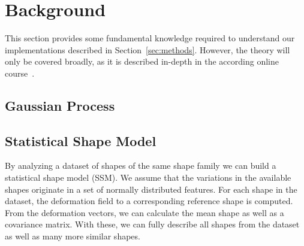 \section{Background}
\label{sec:background}

This section provides some fundamental knowledge required to understand our implementations described in Section~\ref{sec:methods}.
However, the theory will only be covered broadly, as it is described in-depth in the according online course~\citep{mooc2019statistical}.


\subsection{Gaussian Process}
\label{subsec:gp}



\subsection{Statistical Shape Model}
\label{subsec:ssm}

By analyzing a dataset of shapes of the same shape family we can build a statistical shape model (SSM).
We assume that the variations in the available shapes originate in a set of normally distributed features.
For each shape in the dataset, the deformation field to a corresponding reference shape is computed.
From the deformation vectors, we can calculate the mean shape as well as a covariance matrix.
With these, we can fully describe all shapes from the dataset as well as many more similar shapes.



